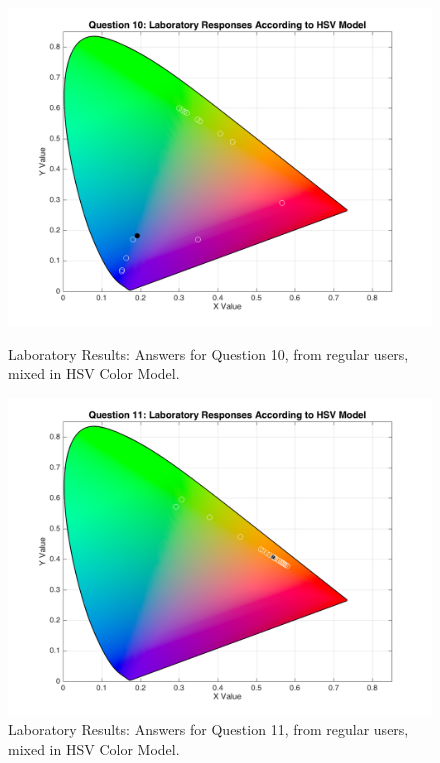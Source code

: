 \begin{enumerate}
\begin{figure}[htbp]
\begin{minipage}{0.48\textwidth}
      \centering
      \includegraphics[width=\textwidth]{images/10_lab_HSVresponses.png}
      \caption[Laboratory Results: Answers for Question 10, from regular users, mixed in HSV Color Model.]{Laboratory Results: Answers for Question 10, from regular users, mixed in HSV Color Model.}
      \label{fig:labhsvregular_10}
    \end{minipage}\hfill
    \begin{minipage}{0.48\textwidth}
      \centering
      \includegraphics[width=\textwidth]{images/11_lab_HSVresponses.png}
      \caption[Laboratory Results: Answers for Question 11, from regular users, mixed in HSV Color Model.]{Laboratory Results: Answers for Question 11, from regular users, mixed in HSV Color Model.}

\end{minipage}
\end{figure}
\end{enumerate}
